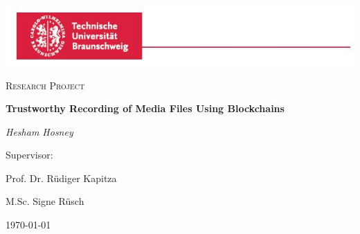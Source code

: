 \documentclass{report}
\begin{document}
\begin{titlepage}
	\centering
	\includegraphics[width=\paperwidth]{images/logo.jpg}\par\vspace{1cm}
	{\scshape\LARGE  \par}
	\vspace{1cm}
	{\scshape\Large Research Project\par}
	\vspace{1.5cm}
	{\huge\bfseries Trustworthy Recording of Media Files Using Blockchains \par}
	\vspace{1cm}
	{\huge\itshape Hesham Hosney\par}
        \vspace{2cm} 
	{\Large Supervisor:\par } 
	{\huge Prof. Dr. Rüdiger Kapitza\par}
        \vspace{.5cm} 
        {\huge M.Sc. Signe Rüsch}
	\vfill
	{\large \today\par}
\end{titlepage}


\cleardoublepage

\tableofcontents

\cleardoublepage









\end{document}
